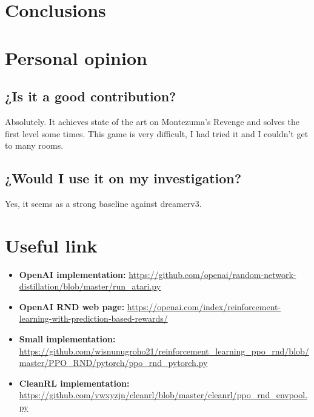 \documentclass[11pt,a4paper]{article}
\begin{document}
\section{Conclusions}

\section*{Personal opinion}
\subsection{¿Is it a good contribution?}
Absolutely. It achieves state of the art on Montezuma's Revenge and solves the first level some times. This game is very difficult, I had tried it and I couldn't get to many rooms. 

\subsection{¿Would I use it on my investigation?}
Yes, it seems as a strong baseline against dreamerv3.


\section*{Useful link}
\begin{itemize}
    \item \textbf{OpenAI implementation:} \url{https://github.com/openai/random-network-distillation/blob/master/run_atari.py}
    \item \textbf{OpenAI RND web page:} \url{https://openai.com/index/reinforcement-learning-with-prediction-based-rewards/}
    \item \textbf{Small implementation:} \url{https://github.com/wisnunugroho21/reinforcement_learning_ppo_rnd/blob/master/PPO_RND/pytorch/ppo_rnd_pytorch.py}
    \item \textbf{CleanRL implementation:} \url{https://github.com/vwxyzjn/cleanrl/blob/master/cleanrl/ppo_rnd_envpool.py}
\end{itemize}



\end{document}
